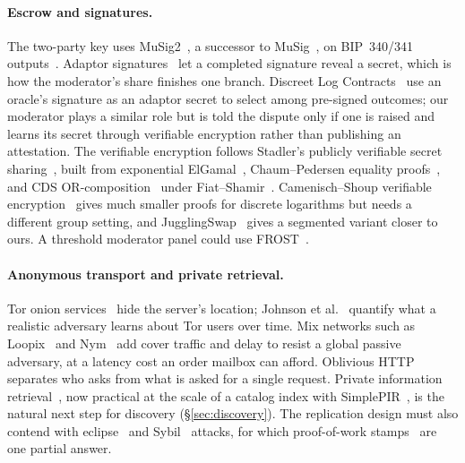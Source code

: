 \paragraph{Escrow and signatures.} The two-party key uses MuSig2~\citep{nick2021musig2,bip327}, a successor to MuSig~\citep{maxwell2019musig}, on BIP~340/341 outputs~\citep{bip340,bip341}. Adaptor signatures~\citep{aumayr2021adaptor} let a completed signature reveal a secret, which is how the moderator's share finishes one branch. Discreet Log Contracts~\citep{dryja2017dlc} use an oracle's signature as an adaptor secret to select among pre-signed outcomes; our moderator plays a similar role but is told the dispute only if one is raised and learns its secret through verifiable encryption rather than publishing an attestation. The verifiable encryption follows Stadler's publicly verifiable secret sharing~\citep{stadler1996pvss}, built from exponential ElGamal~\citep{elgamal1985}, Chaum--Pedersen equality proofs~\citep{chaum1992}, and CDS OR-composition~\citep{cramer1994} under Fiat--Shamir~\citep{fiat1986}. Camenisch--Shoup verifiable encryption~\citep{camenisch2003} gives much smaller proofs for discrete logarithms but needs a different group setting, and JugglingSwap~\citep{shlomovits2020juggling} gives a segmented variant closer to ours. A threshold moderator panel could use FROST~\citep{komlo2020frost,rfc9591}.

\paragraph{Anonymous transport and private retrieval.} Tor onion services~\citep{dingledine2004tor,torrendv3} hide the server's location; Johnson et al.~\citep{johnson2013users} quantify what a realistic adversary learns about Tor users over time. Mix networks such as Loopix~\citep{piotrowska2017loopix} and Nym~\citep{diaz2021nym} add cover traffic and delay to resist a global passive adversary, at a latency cost an order mailbox can afford. Oblivious HTTP~\citep{rfc9458} separates who asks from what is asked for a single request. Private information retrieval~\citep{chor1995pir}, now practical at the scale of a catalog index with SimplePIR~\citep{henzinger2023simplepir}, is the natural next step for discovery (\S\ref{sec:discovery}). The replication design must also contend with eclipse~\citep{heilman2015eclipse} and Sybil~\citep{douceur2002sybil} attacks, for which proof-of-work stamps~\citep{back2002hashcash} are one partial answer.
